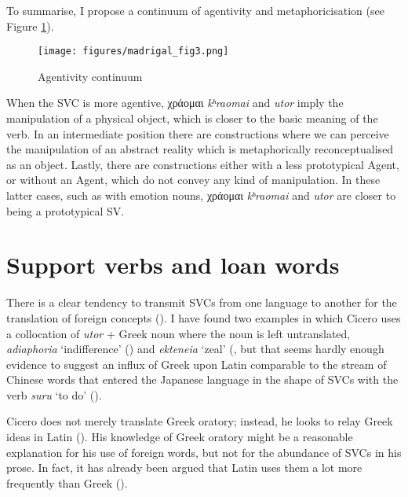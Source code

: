 \documentclass[output=paper,colorlinks,citecolor=brown]{langscibook}
\begin{document}
\z

\z

To summarise, I propose a continuum of agentivity and metaphoricisation (see Figure
\ref{fig:ma:3}). 


\begin{figure}[htb]
  \centering
  \texttt{[image: figures/madrigal\_fig3.png]}
  \caption{Agentivity continuum}
  \label{fig:ma:3}
\end{figure}


When the SVC is more agentive, χράομαι \emph{kʰraomai}
and \emph{utor} imply the manipulation of a physical object, which is closer to the basic
meaning of the verb. In an intermediate position there are constructions where we can
perceive the manipulation of an abstract reality which is metaphorically reconceptualised
as an object. Lastly, there are constructions either with a less prototypical Agent, or
without an Agent, which do not convey any kind of manipulation. In these latter cases,
such as with emotion nouns, χράομαι \emph{kʰraomai} and \emph{utor} are
closer to being a prototypical SV.



\section{Support verbs and loan words}\label{sec:ma:7}

There is a clear tendency to transmit SVCs from one language to another for the
translation of foreign concepts (\cite[172-173]{bowern_diachrony_2008}). I have found two
examples in which Cicero uses a collocation of \emph{utor} + Greek noun where the noun is
left untranslated, \emph{adiaphoria} `indifference' () and
\emph{ekteneia} `zeal' (, but that seems hardly enough
evidence to suggest an influx of Greek upon Latin comparable to the stream of Chinese
words that entered the Japanese language in the shape of SVCs with the verb \emph{suru}
`to do' (\cite[172]{lanz_diachrony_2009}).

Cicero does not merely translate Greek oratory; instead, he looks to relay Greek ideas in
Latin (). His knowledge of Greek oratory might be a reasonable
explanation for his use of foreign words, but not for the abundance of SVCs in his prose.
In fact, it has already been argued that Latin uses them a lot more frequently than Greek
(\cite[186]{jimenez_lopez_support_2016}).
\end{document}
